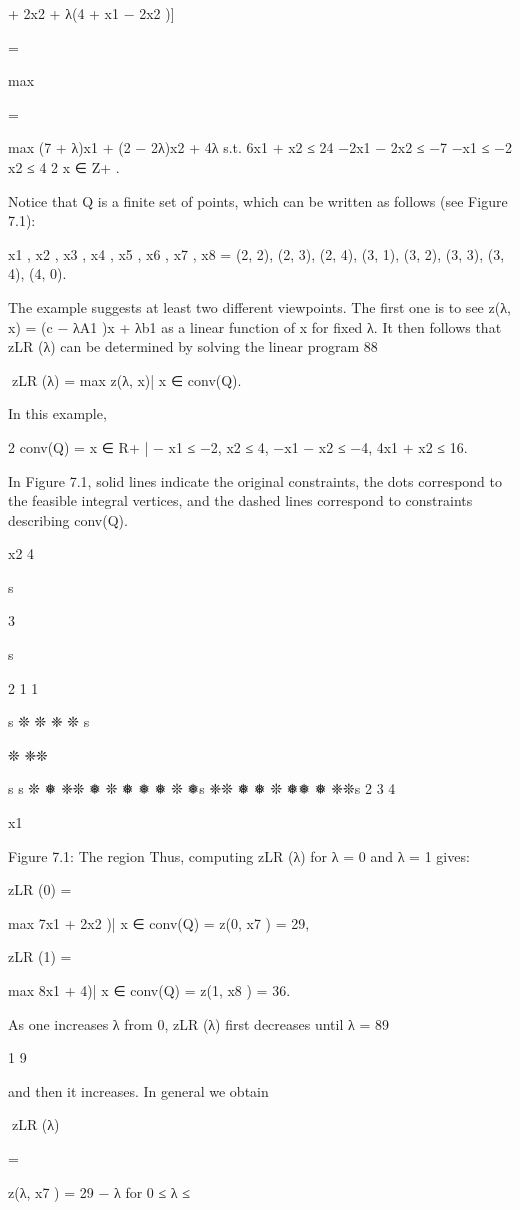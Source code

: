 \documentclass[titlepage]{book}
\theoremstyle{plain}
\theoremstyle{definition}
\theoremstyle{remark}
\begin{document}
+ 2x2 + λ(4 + x1 − 2x2 )]

=

max

=

max (7 + λ)x1 + (2 − 2λ)x2 + 4λ
s.t. 6x1 + x2 ≤ 24
−2x1 − 2x2 ≤ −7
−x1 ≤ −2
x2 ≤ 4
2
x ∈ Z+
.

Notice that Q is a finite set of points, which can be written as follows (see Figure 7.1):

{x1 , x2 , x3 , x4 , x5 , x6 , x7 , x8 } = {(2, 2), (2, 3), (2, 4), (3, 1), (3, 2), (3, 3), (3, 4), (4, 0)}.

The example suggests at least two different viewpoints. The first one is to see z(λ, x) = (c − λA1 )x + λb1
as a linear function of x for fixed λ. It then follows that zLR (λ) can be determined by solving the linear
program
88

zLR (λ) = max {z(λ, x)| x ∈ conv(Q)}.

In this example,

2
conv(Q) = {x ∈ R+
| − x1 ≤ −2, x2 ≤ 4, −x1 − x2 ≤ −4, 4x1 + x2 ≤ 16}.

In Figure 7.1, solid lines indicate the original constraints, the dots correspond to the feasible integral
vertices, and the dashed lines correspond to constraints describing conv(Q).

x2
4

s

3

s

2
1
1

s ❊
❊
❈ ❊
s

❊
❈❊

s
s ❊
❅
❈❊
❅
❊
❅
❅ ❅
❊
❅s
❈❊
❅
❅ ❊
❅❅
❅ ❈❊s
2
3
4

x1

Figure 7.1: The region
Thus, computing zLR (λ) for λ = 0 and λ = 1 gives:

zLR (0) =

max {7x1 + 2x2 )| x ∈ conv(Q)} = z(0, x7 ) = 29,

zLR (1) =

max {8x1 + 4)| x ∈ conv(Q)} = z(1, x8 ) = 36.

As one increases λ from 0, zLR (λ) first decreases until λ =
89

1
9

and then it increases. In general we obtain

zLR (λ)

=

z(λ, x7 ) = 29 − λ for 0 ≤ λ ≤
\end{document}
